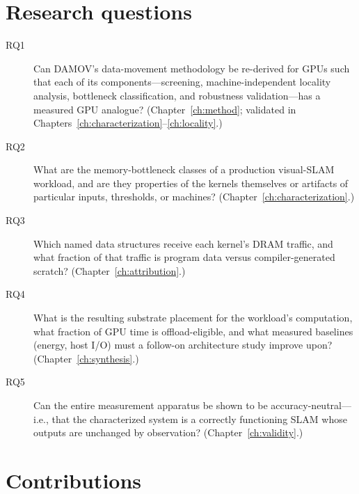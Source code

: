 \section{Research questions}

\begin{description}
\item[RQ1] Can DAMOV's data-movement methodology be re-derived for GPUs such
that each of its components---screening, machine-independent locality
analysis, bottleneck classification, and robustness validation---has a
measured GPU analogue? (Chapter~\ref{ch:method};
validated in Chapters~\ref{ch:characterization}--\ref{ch:locality}.)
\item[RQ2] What are the memory-bottleneck classes of a production visual-SLAM
workload, and are they properties of the kernels themselves or artifacts of
particular inputs, thresholds, or machines?
(Chapter~\ref{ch:characterization}.)
\item[RQ3] Which named data structures receive each kernel's DRAM traffic,
and what fraction of that traffic is program data versus compiler-generated
scratch? (Chapter~\ref{ch:attribution}.)
\item[RQ4] What is the resulting substrate placement for the workload's
computation, what fraction of GPU time is offload-eligible, and what
measured baselines (energy, host I/O) must a follow-on architecture study
improve upon? (Chapter~\ref{ch:synthesis}.)
\item[RQ5] Can the entire measurement apparatus be shown to be
accuracy-neutral---i.e., that the characterized system is a correctly
functioning SLAM whose outputs are unchanged by observation?
(Chapter~\ref{ch:validity}.)
\end{description}

\section{Contributions}

